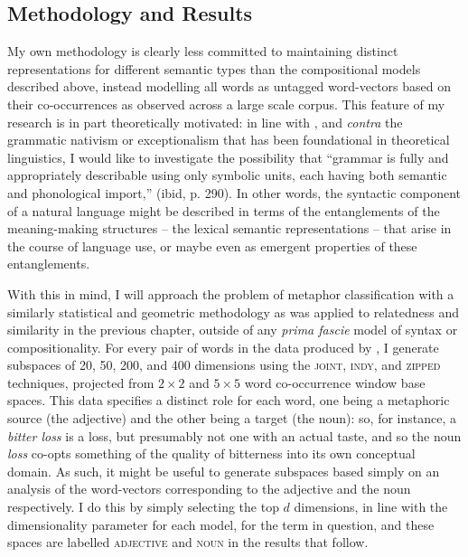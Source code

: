 \subsection{Methodology and Results} \label{sec:metameth}
My own methodology is clearly less committed to maintaining distinct representations for different semantic types than the compositional models described above, instead modelling all words as untagged word-vectors based on their co-occurrences as observed across a large scale corpus.  This feature of my research is in part theoretically motivated: in line with \cite{Langacker1991}, and \emph{contra} the grammatic nativism or exceptionalism that has been foundational in theoretical linguistics, I would like to investigate the possibility that ``grammar is fully and appropriately describable using only symbolic units, each having both semantic and phonological import,'' (ibid, p. 290).  In other words, the syntactic component of a natural language might be described in terms of the entanglements of the meaning-making structures -- the lexical semantic representations -- that arise in the course of language use, or maybe even as emergent properties of these entanglements.

With this in mind, I will approach the problem of metaphor classification with a similarly statistical and geometric methodology as was applied to relatedness and similarity in the previous chapter, outside of any \emph{prima fascie} model of syntax or compositionality.  For every pair of words in the data produced by \cite{GutierrezEA2016}, I generate subspaces of 20, 50, 200, and 400 dimensions using the \textsc{joint}, \textsc{indy}, and \textsc{zipped} techniques, projected from $2 \times 2$ and $5 \times 5$ word co-occurrence window base spaces.  This data specifies a distinct role for each word, one being a metaphoric source (the adjective) and the other being a target (the noun): so, for instance, a \emph{bitter loss} is a loss, but presumably not one with an actual taste, and so the noun \emph{loss} co-opts something of the quality of bitterness into its own conceptual domain.
As such, it might be useful to generate subspaces based simply on an analysis of the word-vectors corresponding to the adjective and the noun respectively.  I do this by simply selecting the top $d$ dimensions, in line with the dimensionality parameter for each model, for the term in question, and these spaces are labelled \textsc{adjective} and \textsc{noun} in the results that follow.

